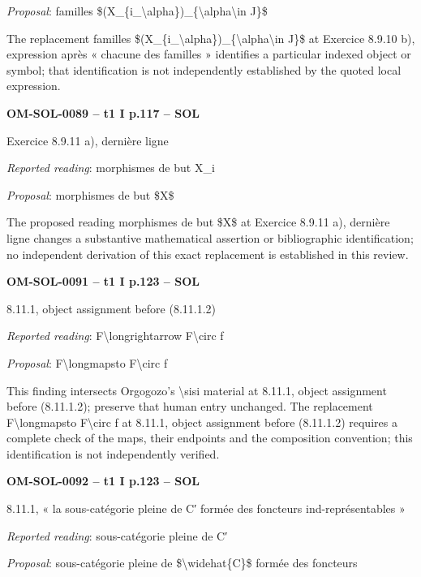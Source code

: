 \emph{Proposal}: familles \$(X\_\{i\_\textbackslash{}alpha\})\_\{\textbackslash{}alpha\textbackslash{}in J\}\$\par
The replacement familles \$(X\_\{i\_\textbackslash{}alpha\})\_\{\textbackslash{}alpha\textbackslash{}in J\}\$ at Exercice 8.9.10 b), expression après « chacune des familles » identifies a particular indexed object or symbol; that identification is not independently established by the quoted local expression.\par
\par\noindent\textbf{OM-SOL-0089 -- t1 I p.117 -- SOL}\par
Exercice 8.9.11 a), dernière ligne\par
\emph{Reported reading}: morphismes de but X\_i\par
\emph{Proposal}: morphismes de but \$X\$\par
The proposed reading morphismes de but \$X\$ at Exercice 8.9.11 a), dernière ligne changes a substantive mathematical assertion or bibliographic identification; no independent derivation of this exact replacement is established in this review.\par
\par\noindent\textbf{OM-SOL-0091 -- t1 I p.123 -- SOL}\par
8.11.1, object assignment before (8.11.1.2)\par
\emph{Reported reading}: F\textbackslash{}longrightarrow F\textbackslash{}circ f\par
\emph{Proposal}: F\textbackslash{}longmapsto F\textbackslash{}circ f\par
This finding intersects Orgogozo's \textbackslash{}sisi material at 8.11.1, object assignment before (8.11.1.2); preserve that human entry unchanged. The replacement F\textbackslash{}longmapsto F\textbackslash{}circ f at 8.11.1, object assignment before (8.11.1.2) requires a complete check of the maps, their endpoints and the composition convention; this identification is not independently verified.\par
\par\noindent\textbf{OM-SOL-0092 -- t1 I p.123 -- SOL}\par
8.11.1, « la sous-catégorie pleine de C′ formée des foncteurs ind-représentables »\par
\emph{Reported reading}: sous-catégorie pleine de C′\par
\emph{Proposal}: sous-catégorie pleine de \$\textbackslash{}widehat\{C\}\$ formée des foncteurs\par
